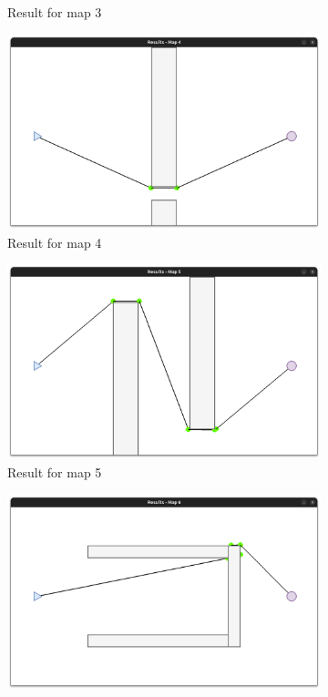 \documentclass[../main.tex]{subfiles}
\begin{document}
\begin{figure}[H]
\begin{subfigure}[b]{0.24\textwidth}
		\caption*{Result for map 3}
		\label{fig:rmap3}
	\end{subfigure}
	\hfill
	\begin{subfigure}[b]{0.24\textwidth}
		\centering
		\includegraphics[width=\textwidth]{IMAGES/part3/rmap4.png}
		\caption*{Result for map 4}
		\label{fig:rmap4}
	\end{subfigure}
	\vfill
	\begin{subfigure}[b]{0.24\textwidth}
		\centering
		\includegraphics[width=\textwidth]{IMAGES/part3/rmap5.png}
		\caption*{Result for map 5}
		\label{fig:rmap5}
	\end{subfigure}
	\hfill
	\begin{subfigure}[b]{0.24\textwidth}
		\centering
		\includegraphics[width=\textwidth]{IMAGES/part3/rmap6.png}

\end{subfigure}
\end{figure}
\end{document}
